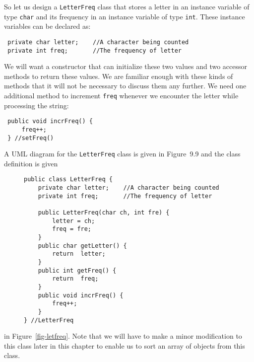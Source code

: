 So let us design a {\tt LetterFreq} class that stores a letter
in an instance variable of type {\tt char} and its frequency in an instance
variable of type {\tt int}. These instance variables can be declared as:

\begin{jjjlisting}
\begin{lstlisting}
 private char letter;    //A character being counted
 private int freq;       //The frequency of letter
\end{lstlisting}
\end{jjjlisting}

\noindent We will want a constructor that can initialize these two values
and two accessor methods to return these values.  We are familiar enough
with these kinds of methods that it will not be necessary to discuss them any
further.  We need one additional method to increment {\tt freq} whenever
we encounter the letter while processing the string:

\begin{jjjlisting}
\begin{lstlisting}
 public void incrFreq() {
     freq++;
 } //setFreq()
\end{lstlisting}
\end{jjjlisting}

A UML diagram for the {\tt LetterFreq} class is given in Figure~9.9 and
the class definition is given
\begin{figure}[tb]
\jjjprogstart
\begin{jjjlisting}
\begin{lstlisting}
public class LetterFreq {
    private char letter;    //A character being counted
    private int freq;       //The frequency of letter

    public LetterFreq(char ch, int fre) {
        letter = ch;
        freq = fre;
    }
    public char getLetter() {
        return  letter;
    }
    public int getFreq() {
        return  freq;
    }
    public void incrFreq() {
        freq++;
    }
} //LetterFreq
\end{lstlisting}
\end{jjjlisting}
\end{figure}
in Figure~\ref{fig-letfreq}. Note that we will have to make a minor
modification to this class later in this chapter to enable us to sort
an array of objects from this class.


